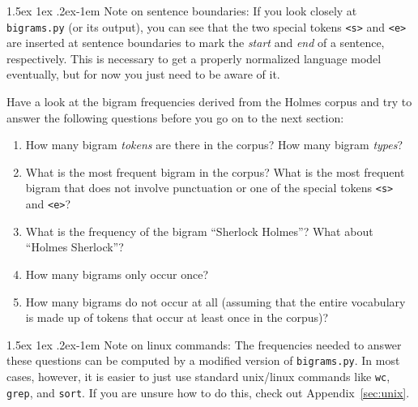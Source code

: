 \documentclass[11pt]{article}
\makeatletter
\renewcommand{\paragraph}{%
  \@startsection{paragraph}{4}%
  {\z@}{1.5ex \@plus 1ex \@minus .2ex}{-1em}%
  {\normalfont\normalsize\bfseries}%
}\makeatother
\makeatother
\begin{document}

\paragraph{Note on sentence boundaries:} If you look closely at {\tt bigrams.py} (or its output), 
you can see that the two special tokens {\tt <s>} and {\tt <e>} are inserted at sentence boundaries
to mark the {\em start} and {\em end} of a sentence, respectively. This is necessary to get a properly
normalized language model eventually, but for now you just need to be aware of it.

\vspace{0.3cm}
\noindent
Have a look at the bigram frequencies derived from the Holmes corpus and try to answer the following questions 
before you go on to the next section:
\begin{enumerate}
\item How many bigram {\em tokens} are there in the corpus? %
How many bigram {\em types}? %
\item What is the most frequent bigram in the corpus? %
What is the most frequent bigram that does not involve punctuation or one of the special tokens {\tt <s>} and {\tt <e>}? %
\item What is the frequency of the bigram ``Sherlock Holmes''? %
What about ``Holmes Sherlock''? %
\item How many bigrams only occur once? %
\item How many bigrams do not occur at all (assuming that the entire vocabulary is made up of tokens that occur at least once in the corpus)?
\end{enumerate}

\paragraph{Note on linux commands:} The frequencies needed to answer these questions can be computed by a modified version
of {\tt bigrams.py}. In most cases, however, it is easier to just use standard unix/linux commands like {\tt wc}, {\tt grep}, and {\tt sort}.
If you are unsure how to do this, check out Appendix~\ref{sec:unix}.
\end{document}
